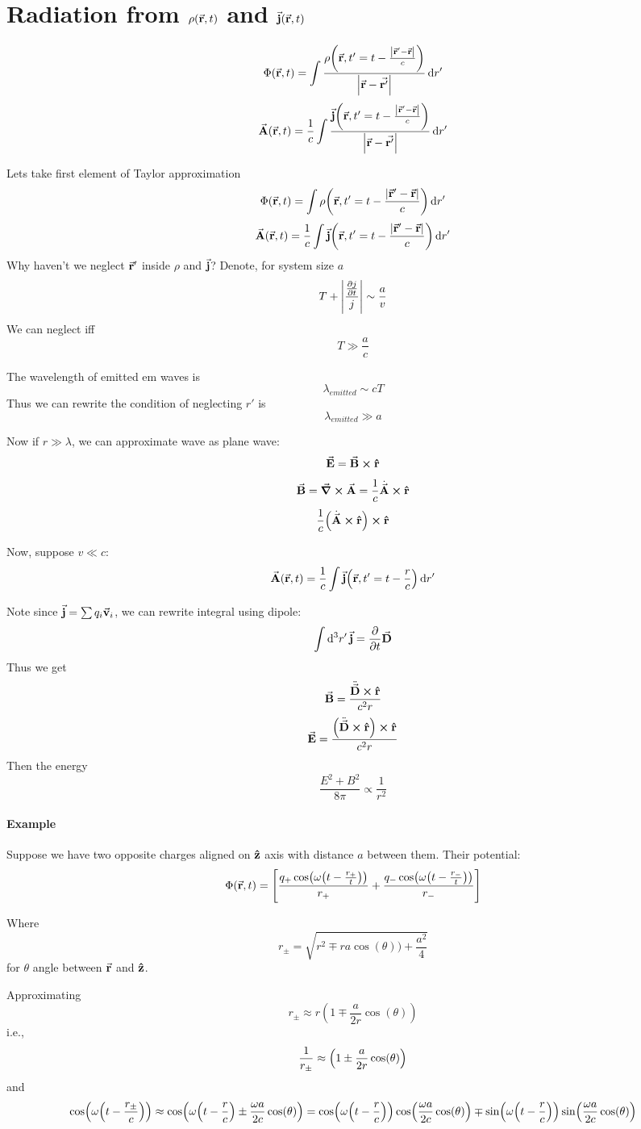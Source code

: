 \section{Radiation from $\rho(\va{r},t)$ and $\va{j}(\va{r},t)$}
$$\Phi(\va{r},t) = \int \frac{\rho\qty(\va{r},t'=t-\frac{ \abs{\va{r}' - \va{r}}}{c})}{\abs{\va{r}-\va{r'}}} \dd{r'}$$
$$\va{A}(\va{r},t) = \frac{1}{c} \int \frac{\va{j}\qty(\va{r},t'=t-\frac{ \abs{\va{r}' - \va{r}}}{c})}{\abs{\va{r}-\va{r'}}} \dd{r'}$$

Lets take first element of Taylor approximation
$$\Phi(\va{r},t) = \int \rho\qty(\va{r},t'=t-\frac{ \abs{\va{r}' - \va{r}}}{c}) \dd{r'}$$
$$\va{A}(\va{r},t) = \frac{1}{c} \int\va{j}\qty(\va{r},t'=t-\frac{ \abs{\va{r}' - \va{r}}}{c}) \dd{r'}$$
Why haven't we neglect $\va{r}'$ inside $\rho$ and $\va{j}$?
Denote, for system size $a$
$$T+\abs{\frac{\pdv{j}{t}}{j}} \sim \frac{a}{v} $$
We can neglect iff $$T\gg \frac{a}{c}$$

The wavelength of emitted em waves is
$$\lambda_{emitted} \sim cT$$
Thus we can rewrite the condition of neglecting $r'$ is
$$\lambda_{emitted} \gg a$$


Now if $r\gg \lambda$, we can approximate wave as plane wave:
$$\va{E} = \va{B} \cross \vu{r}$$
$$\va{B} = \curl{\va{A}} = \frac{1}{c} \dot{\va{A}} \cross \vu{r}$$
$$ \frac{1}{c} \qty(\dot{\va{A}} \cross \vu{r}) \cross \vu{r}$$

Now, suppose $v\ll c$:
$$\va{A}(\va{r},t) = \frac{1}{c} \int\va{j}\qty(\va{r},t'=t-\frac{r }{c}) \dd{r'}$$

Note since $\va{j} = \sum q_i \va{v}_i$, we can rewrite integral using dipole:
$$\int \dd[3]{r'} \va{j} = \pdv{t} \va{D}$$
Thus we get
$$\va{B}= \frac{\ddot{\va{D}}\cross \vu{r}}{c^2r}$$
$$\va{E}= \frac{\qty(\ddot{\va{D}}\cross \vu{r})\cross \vu{r}}{c^2r}$$
Then the energy
$$\frac{E^2+B^2}{8\pi} \propto \frac{1}{r^2}$$

\paragraph{Example} %
Suppose we have two opposite charges aligned on $\vu{z}$ axis with distance $a$ between them. Their potential:
$$\Phi(\va{r},t) = \qty[\frac{q_+ \cos(\omega\qty(t-\frac{r_+}{t}))}{r_+}+\frac{q_- \cos(\omega\qty(t-\frac{r_-}{t}))}{r_-}]$$

Where
$$r_{\pm} = \sqrt{r^2 \mp ra\cos(\theta))+\frac{a^2}{4}}$$
for $\theta$ angle between $\va{r}$ and $\vu{z}$.

Approximating
$$r_\pm \approx r(1\mp \frac{a}{2r}\cos(\theta))$$
i.e.,
$$\frac{1}{r_\pm} \approx \qty(1\pm \frac{a}{2r}\cos(\theta))$$
and
$$\cos(\omega\qty(t-\frac{r_\pm}{c})) \approx \cos(\omega\qty(t-\frac{r}{c}) \pm \frac{\omega a}{2c}\cos(\theta)) = \cos(\omega\qty(t-\frac{r}{c}))\cos(\frac{\omega a}{2c}\cos(\theta)) \mp \sin(\omega\qty(t-\frac{r}{c}))\sin(\frac{\omega a}{2c}\cos(\theta))$$

